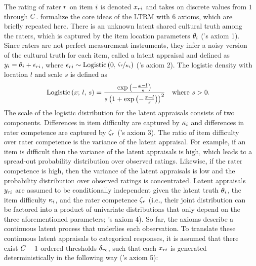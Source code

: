 \documentclass[a4paper,usenames,dvipsnames]{article}
\newenvironment{revision}{\color{black}}{\color{black}}
\begin{document}
The rating of rater $r$ on item $i$ is denoted $x_{ri}$ and takes on discrete values from $1$ through $\Tncat$. \AB{} formalize the core ideas of the LTRM with 6 axioms, which are briefly repeated here. There is an unknown latent shared cultural truth among the raters, which is captured by the item location parameters $\theta_i$ (\AB{}'s axiom 1). Since raters are not perfect measurement instruments, they infer a noisy version of the cultural truth for each item, called a latent appraisal and defined as $y_{i} = \theta_i + \epsilon_{ri}$, where $\epsilon_{ri}\sim \text{Logistic}\left(0,\,\nicefrac{\zeta_r}{\kappa_i}\right)$ (\AB{}'s axiom 2). The logistic density \begin{revision}with location $l$ and scale $s$\end{revision} is defined as
\begin{align*}
	\text{Logistic}\left(x;\,l,\,s\right) = \frac{\exp\left(-\frac{x - l}{s}\right)}{s\left(1 + \exp\left(-\frac{x - l}{s}\right)\right)^2}
	\quad \text{where $s > 0$}.
\end{align*}
The scale of the logistic distribution for the latent appraisals consists of two components. Differences in item difficulty are captured by $\kappa_i$ and differences in rater competence are captured by $\zeta_r$ (\AB{}'s axiom 3). The ratio of item difficulty over rater competence is the variance of the latent appraisal. For example, if an item is difficult then the variance of the latent appraisals is high, which leads to a spread-out probability distribution over observed ratings. Likewise, if the rater competence is high, then the variance of the latent appraisals is low and the probability distribution over observed ratings is concentrated. Latent appraisals $y_{ri}$ are assumed to be conditionally independent given the latent truth $\theta{}_i$, the item difficulty $\kappa_{i}$, and the rater competence $\zeta_r$ (i.e., their joint distribution can be factored into a product of univariate distributions that only depend on the three aforementioned parameters; \AB{}'s axiom 4). So far, the axioms describe a continuous latent process that underlies each observation. To translate these continuous latent appraisals to categorical responses, it is assumed that there exist $\Tncat - 1$ ordered thresholds $\delta_{rc}$, such that each $x_{ri}$ is generated deterministically in the following way (\AB{}'s axiom 5):
\end{document}
